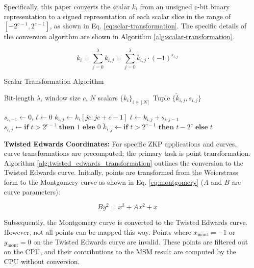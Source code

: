 \documentclass[conference]{IEEEtran}
\begin{document}
Specifically, this paper converts the scalar $k_i$ from an unsigned c-bit binary representation to a signed representation of each scalar slice in the range of $\left[-2^{c-1}, 2^{c-1}\right]$, as shown in Eq. \eqref{eq:sclar-transformation}. The specific details of the conversion algorithm are shown in Algorithm \ref{alg:scalar-transformation}.

\begin{equation}
\label{eq:sclar-transformation}
k_i=\sum_{j=0}^{\lambda} k_{i, j}=\sum_{j=0}^{\lambda} \bar{k}_{i, j} \cdot(-1)^{s_{i, j}}
\end{equation}

\begin{algorithm}
\label{alg:scalar-transformation}
\caption{Scalar Transformation Algorithm}
\begin{algorithmic}[1] %
\REQUIRE Bit-length $\lambda$, window size $c$, $N$ scalars $\{k_i\}_{i \in [N]}$
\ENSURE Tuple $\{\widetilde{k}_{i,j}, s_{i,j}\}$

\STATE $s_{i,-1} \gets 0$, $t \gets 0$
    \STATE $k_{i,j} \gets k_i[jc : jc + c - 1]$
    \STATE $t \gets k_{i,j} + s_{i,j-1}$
    \STATE $s_{i,j} \gets \textbf{if } t > 2^{c-1} \textbf{ then } 1 \textbf{ else } 0$
    \STATE $\widetilde{k}_{i,j} \gets \textbf{if } t > 2^{c-1} \textbf{ then } t - 2^c \textbf{ else } t$
\ENDFOR

\end{algorithmic}
\end{algorithm}

\textbf{Twisted Edwards Coordinates:} For specific ZKP applications and curves, curve transformations are precomputed; the primary task is point transformation. Algorithm \ref{alg:twisted_edwards_transformation} outlines the conversion to the Twisted Edwards curve. Initially, points are transformed from the Weierstrass form to the Montgomery curve as shown in Eq. \eqref{eq:montgomery} ($A$ and $B$ are curve parameters):

\begin{equation}
\label{eq:montgomery}
B y^2 = x^3 + A x^2 + x
\end{equation}

Subsequently, the Montgomery curve is converted to the Twisted Edwards curve. However, not all points can be mapped this way. Points where \( x_{\text{mont}} = -1 \) or \( y_{\text{mont}} = 0 \) on the Twisted Edwards curve are invalid. These points are filtered out on the CPU, and their contributions to the MSM result are computed by the CPU without conversion.
\end{document}

